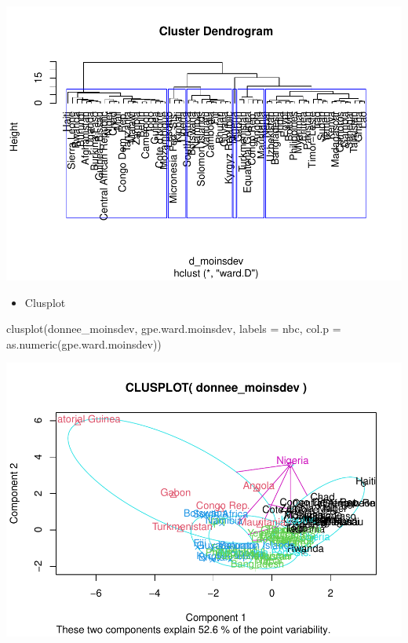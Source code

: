 \documentclass[
]{article}
\newenvironment{Shaded}{}{}
\newcommand{\AttributeTok}[1]{#1}
\newcommand{\FunctionTok}[1]{#1}
\newcommand{\NormalTok}[1]{#1}
\providecommand{\tightlist}{%
  \setlength{\itemsep}{0pt}\setlength{\parskip}{0pt}}
\begin{document}
\includegraphics{Projet_files/figure-latex/unnamed-chunk-35-1.pdf}

\begin{itemize}
\tightlist
\item
  Clusplot
\end{itemize}

\begin{Shaded}
\begin{Highlighting}[]
\FunctionTok{clusplot}\NormalTok{(donnee\_moinsdev, gpe.ward.moinsdev, }\AttributeTok{labels =}\NormalTok{ nbc, }\AttributeTok{col.p =} \FunctionTok{as.numeric}\NormalTok{(gpe.ward.moinsdev))}
\end{Highlighting}
\end{Shaded}

\includegraphics{Projet_files/figure-latex/unnamed-chunk-36-1.pdf}
\end{document}
